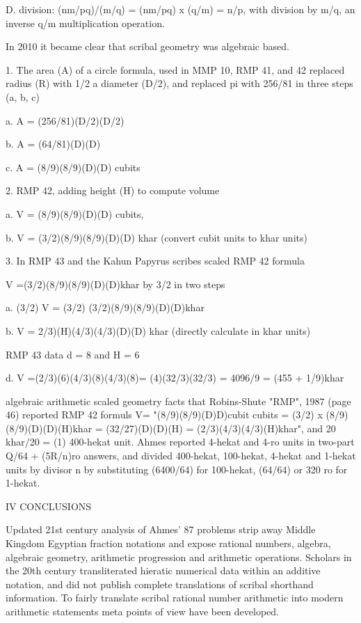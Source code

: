 \documentclass[12pt]{article}
\begin{document}
D. division: (nm/pq)/(m/q) = (nm/pq) x (q/m) = n/p, with division by m/q, an inverse q/m multiplication operation.    

In 2010 it became clear that scribal geometry was algebraic based. 

1. The area (A) of a circle formula, used in MMP 10, RMP 41, and 42 replaced radius (R) with 1/2 a diameter (D/2), and replaced pi with 256/81 in three steps (a, b, c) 

a. A = (256/81)(D/2)(D/2) 

b. A = (64/81)(D)(D)

c. A = (8/9)(8/9)(D)(D) cubits

2. RMP 42, adding height (H) to compute volume

a. V = (8/9)(8/9)(D)(D) cubits,

b. V = (3/2)(8/9)(8/9)(D)(D) khar (convert cubit units to khar units)

3. In RMP 43 and the Kahun Papyrus scribes scaled RMP 42 formula

V =(3/2)(8/9)(8/9)(D)(D)khar by 3/2 in two steps

a. (3/2) V = (3/2) (3/2)(8/9)(8/9)(D)(D)khar 

b. V = 2/3)(H)(4/3)(4/3)(D)(D) khar (directly calculate in khar units)

RMP 43 data d = 8 and H = 6

d. V =(2/3)(6)(4/3)(8)(4/3)(8)= (4)(32/3)(32/3) = 4096/9 = (455 + 1/9)khar

algebraic arithmetic scaled  geometry facts that Robins-Shute "RMP", 1987 (page 46) reported RMP 42 formuls V= "(8/9)(8/9)(D)D)cubit cubits = (3/2) x (8/9)(8/9)(D)(D)(H)khar = (32/27)(D)(D)(H) =  (2/3)(4/3)(4/3)(H)khar", and 20 khar/20 = (1) 400-hekat unit. Ahmes reported 4-hekat and 4-ro units in two-part Q/64 + (5R/n)ro answers, and divided 400-hekat, 100-hekat, 4-hekat and 1-hekat units by divisor n by substituting (6400/64) for 100-hekat, (64/64) or 320 ro for 1-hekat. 

IV CONCLUSIONS

Updated 21st century analysis of Ahmes' 87 problems strip away Middle Kingdom Egyptian fraction notations and expose rational numbers, algebra, algebraic geometry, arithmetic progression and arithmetic operations. Scholars in the 20th century transliterated hieratic numerical data within an additive notation, and did not publish complete translations of scribal shorthand information. To fairly translate scribal rational number arithmetic into modern arithmetic statements meta points of view have been developed.
\end{document}
